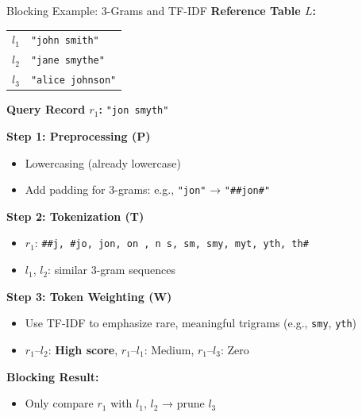 \documentclass[8pt]{beamer} %
\begin{document}
\begin{frame}{Blocking Example: 3-Grams and TF-IDF}
	\textbf{Reference Table $L$:}
	\begin{tabular}{ll}
		$l_1$ & \texttt{"john smith"} \\
		$l_2$ & \texttt{"jane smythe"} \\
		$l_3$ & \texttt{"alice johnson"}
	\end{tabular}
	
	\vspace{0.5em}
	\textbf{Query Record $r_1$:} \texttt{"jon smyth"}
	
	\vspace{0.5em}
	\textbf{Step 1: Preprocessing (P)}
	\begin{itemize}
		\item Lowercasing (already lowercase)
		\item Add padding for 3-grams: e.g., \texttt{"jon"} → \texttt{"\#\#jon\#"}
	\end{itemize}
	
	\vspace{0.5em}
	\textbf{Step 2: Tokenization (T)}
	\begin{itemize}
		\item $r_1$: \texttt{\#\#j, \#jo, jon, on , n s, sm, smy, myt, yth, th\#}
		\item $l_1$, $l_2$: similar 3-gram sequences
	\end{itemize}
	
	\vspace{0.5em}
	\textbf{Step 3: Token Weighting (W)}
	\begin{itemize}
		\item Use TF-IDF to emphasize rare, meaningful trigrams (e.g., \texttt{smy}, \texttt{yth})
		\item $r_1$–$l_2$: \textbf{High score}, $r_1$–$l_1$: Medium, $r_1$–$l_3$: Zero
	\end{itemize}
	
	\vspace{0.5em}
	\textbf{Blocking Result:}
	\begin{itemize}
		\item Only compare $r_1$ with $l_1$, $l_2$ → prune $l_3$
	\end{itemize}
\end{frame}
\end{document}
